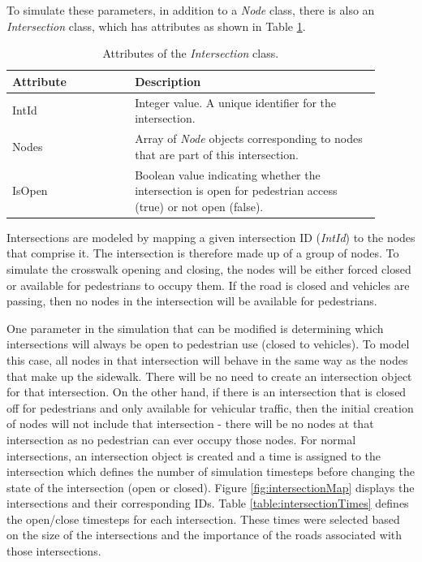 \documentclass[12pt]{article}
\begin{document}
To simulate these parameters, in addition to a \textit{Node} class, there is
also an \textit{Intersection} class, which has attributes as shown in Table
\ref{table:intersection}.

\def\arraystretch{1.5}
\begin{table}[hb!]
  \centering
    \begin{tabular}{p{0.3\linewidth}p{0.6\linewidth}}
     \hline
     Attribute & Description \\
     \hline
     IntId & Integer value. A unique identifier for the intersection. \\
     Nodes & Array of \textit{Node} objects corresponding to nodes
             that are part of this intersection. \\
     IsOpen  & Boolean value indicating whether the intersection is open
             for pedestrian access (true) or not open (false). \\
     \hline
    \end{tabular}
    \caption{Attributes of the \textit{Intersection} class.}
  \label{table:intersection}
\end{table}

Intersections are modeled by mapping a given intersection ID (\textit{IntId})
to the nodes that comprise it. The intersection is therefore made up of a
group of nodes. To simulate the crosswalk opening and closing, the nodes will
be either forced closed or available for pedestrians to occupy them. If the
road is closed and vehicles are passing, then no nodes in the intersection
will be available for pedestrians.

One parameter in the simulation that can be modified is determining which
intersections will always be open to pedestrian use (closed to vehicles). To model this case, all nodes in that intersection will behave
in the same way as the nodes that make up the sidewalk. There will be no need to
create an intersection object for that intersection. On the other hand, if there
is an intersection that is closed off for pedestrians and only available for
vehicular traffic, then the initial creation of nodes will not include that
intersection - there will be no nodes at that intersection as no pedestrian can
ever occupy those nodes.
For normal intersections, an intersection object is created and a time is assigned to the intersection which defines the number of simulation timesteps before changing the state of the intersection (open or closed).  Figure \ref{fig:intersectionMap} displays the intersections and their corresponding IDs.  Table \ref{table:intersectionTimes} defines the open/close timesteps for each intersection.  These times were selected based on the size of the intersections and the importance of the roads associated with those intersections.
\end{document}
